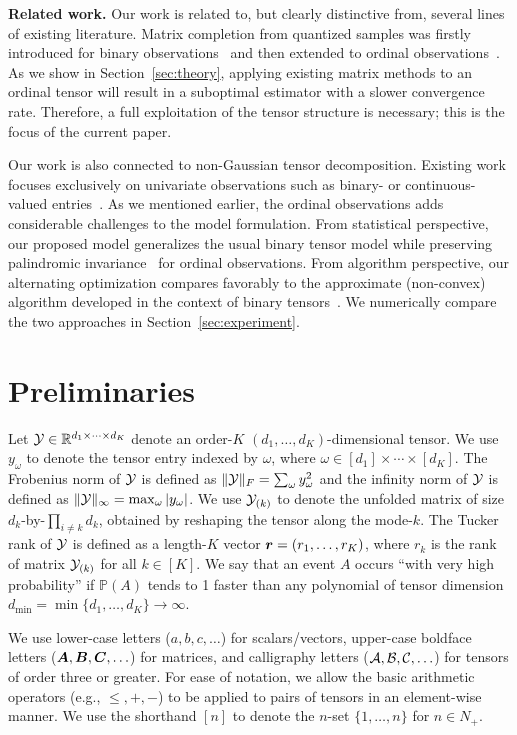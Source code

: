 \documentclass{article}
\theoremstyle{plain}
\theoremstyle{definition}
\begin{document}
{\bf Related work.} Our work is related to, but clearly distinctive from, several lines of existing literature. Matrix completion from quantized samples was firstly introduced for binary observations~\cite{cai2013max,davenport2014,bhaskar20151} and then extended to ordinal observations~\cite{bhaskar2016probabilistic}. As we show in Section~\ref{sec:theory}, applying existing matrix methods to an ordinal tensor will result in a suboptimal estimator with a slower convergence rate. Therefore, a full exploitation of the tensor structure is necessary; this is the focus of the current paper.

Our work is also connected to non-Gaussian tensor decomposition. Existing work focuses exclusively on univariate observations such as binary- or continuous-valued entries~\citep{wang2018learning,hong2018generalized}. As we mentioned earlier, the ordinal observations adds considerable challenges to the model formulation. From statistical perspective, our proposed model generalizes the usual binary tensor model while preserving palindromic invariance~\cite{mccullagh1980regression} for ordinal observations. From algorithm perspective, our alternating optimization compares favorably to the approximate (non-convex) algorithm developed in the context of binary tensors~\cite{ghadermarzy2018learning}. We numerically compare the two approaches in Section~\ref{sec:experiment}.


\section{Preliminaries}
Let $\mathcal{Y}\in\mathbb{R}^{d_1\times \cdots \times d_K}$ denote an order-$K$ $(d_1,\ldots,d_K)$-dimensional tensor. We use $y_\omega$ to denote the tensor entry indexed by $\omega$, where $\omega\in[d_1]\times\cdots\times[d_K]$.  The Frobenius norm of $\mathcal{Y}$ is defined as $\lVert\mathcal{Y}\rVert_F=\sum_\omega y^2_\omega$ and the infinity norm of $\mathcal{Y}$ is defined as $\lVert\mathcal{Y}\rVert_\infty=\max_{\omega}|y_\omega|$. We use $\mathcal{Y}_{(k)}$ to denote the unfolded matrix of size $d_k$-by-$\prod_{i\neq k}d_k$, obtained by reshaping the tensor along the mode-$k$. The Tucker rank of $\mathcal{Y}$ is defined as a length-$K$ vector $\bm{r} = (r_1,\ldots,r_K)$, where $r_k$ is the rank of matrix $\mathcal{Y}_{(k)}$ for all $k \in[K]$. We say that an event $A$ occurs ``with very high probability'' if $\mathbb{P}(A)$ tends to 1 faster than any polynomial of tensor dimension $d_{\min}=\min\{d_1,\ldots,d_K\} \to\infty$.

We use lower-case letters ($a, b, c, \ldots$) for scalars/vectors, upper-case boldface letters ($\bm A, \bm B, \bm C, \ldots$) for matrices, and calligraphy letters ($\mathcal{A},\mathcal{B},\mathcal{C},\ldots$) for tensors of order three or greater. For ease of notation, we allow the basic arithmetic operators (e.g., $\leq, +, -$) to be applied to pairs of tensors in an element-wise manner. We use the shorthand $[n]$ to denote the $n$-set $\{1,\ldots,n\}$ for $n \in N_{+}$.
\end{document}
